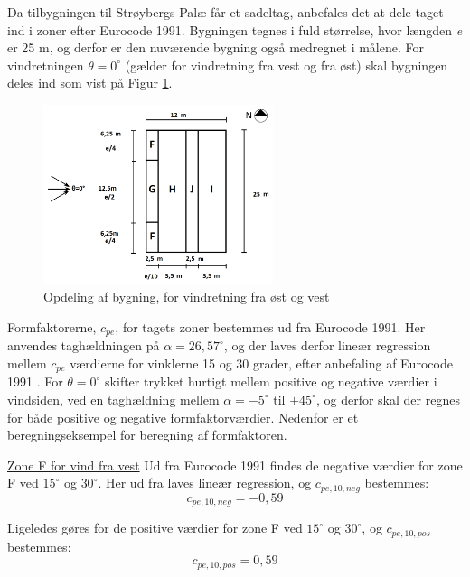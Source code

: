 Da tilbygningen til Strøybergs Palæ får et sadeltag, anbefales det at dele taget ind i zoner efter Eurocode 1991. Bygningen tegnes i fuld størrelse, hvor længden \textit{e} er 25 m, og derfor er den nuværende bygning også medregnet i målene. For vindretningen $\theta = 0^{\circ}$ (gælder for vindretning fra vest og fra øst) skal bygningen deles ind som vist på Figur \ref{fig:opdeling}.  

\begin{figure}[htbp]
	\centering
	\includegraphics[width=0.6\textwidth]{billeder/opdeling.png}
	\caption{Opdeling af bygning, for vindretning fra øst og vest \citep[ kapitel 7.2.5]{EU91}}
	\label{fig:opdeling}
\end{figure}

Formfaktorerne, $c_{pe}$, for tagets zoner bestemmes ud fra Eurocode 1991. Her anvendes taghældningen på $\alpha = 26,\!57^{\circ}$, og der laves derfor lineær regression mellem $c_{pe}$ værdierne for vinklerne 15 og 30 grader, efter anbefaling af Eurocode 1991 \citep[ tabel 7.4a kapitel 7.2.5]{EU91}. For $\theta = 0^{\circ}$ skifter trykket hurtigt mellem positive og negative værdier i vindsiden, ved en taghældning mellem $\alpha = -5^{\circ}$ til $+ 45^{\circ}$, og derfor skal der regnes for både positive og negative formfaktorværdier. 
\newline \indent{     }  Nedenfor er et beregningseksempel for beregning af formfaktoren.


\underline{Zone F for vind fra vest}
\newline
Ud fra Eurocode 1991 \citep[ tabel 7.4a kapitel 7.2.5]{EU91} findes de negative værdier for zone F ved $15^{\circ}$ og $30^{\circ}$. Her ud fra laves lineær regression, og $c_{pe,10,neg}$ bestemmes:
\begin{equation}
	c_{pe,10,neg} = -0,\!59
\end{equation}

Ligeledes gøres for de positive værdier for zone F ved $15^{\circ}$ og $30^{\circ}$, og $c_{pe,10,pos}$ bestemmes:
\begin{equation}
	c_{pe,10,pos}=0,\!59
\end{equation}

